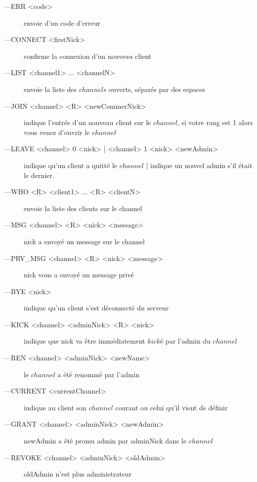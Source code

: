 \documentclass[12pt]{article}
\begin{document}
\begin{description}
    \item[---ERR <code>]  envoie d'un code d'erreur
    \item[---CONNECT <firstNick>]  confirme la connexion
                                                        d'un nouveau client
    \item[---LIST <channel1> ... <channelN>]  envoie la liste des $channels$
                                                ouverts, séparés par des espaces
    \item[---JOIN <channel> <R> <newCommerNick>]  indique l'entrée
                                d'un nouveau client sur le $channel$, si votre rang est
                                1 alors vous venez d'ouvrir le $channel$
    \item[---LEAVE <channel> 0 <nick> | <channel> 1 <nick> <newAdmin>] 
                indique qu'un client a quitté le $channel$ | indique un nouvel admin
                s'il était le dernier.
    \item[---WHO <R> <client1> ... <R> <clientN>]  envoie la liste des clients
                                    sur le channel
    \item[---MSG <channel> <R> <nick> <message>]  nick a envoyé un message sur le channel
    \item[---PRV\_MSG <channel> <R> <nick> <message>]  nick vous a envoyé un message privé
    \item[---BYE <nick>]  indique qu'un client s'est déconnecté du serveur
    \item[---KICK <channel> <adminNick> <R> <nick>]  indique que nick va être
    immédiatement $kické$ par l'admin du $channel$
    \item[---REN <channel> <adminNick> <newName>]  le $channel$ a été renommé par l'admin
    \item[---CURRENT <currentChannel>]  indique au client son $channel$ courant ou celui qu'il vient de définir
    \item[---GRANT <channel> <adminNick> <newAdmin>]  newAdmin a été promu admin par adminNick dans le $channel$
    \item[---REVOKE <channel> <adminNick> <oldAdmin>]  oldAdmin n'est plus administrateur
    \\
\end{description}
\end{document}
